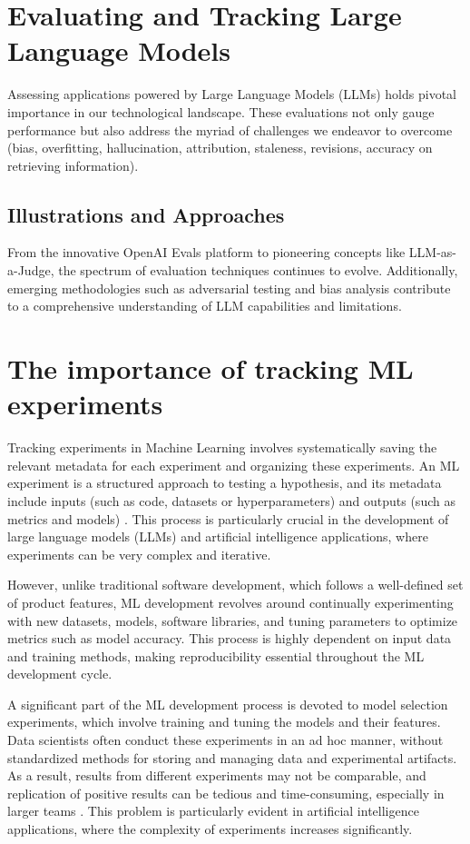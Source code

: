 \section{Evaluating and Tracking Large Language Models}
Assessing applications powered by Large Language Models (LLMs) holds pivotal importance in our technological landscape. These evaluations not only gauge performance but also address the myriad of challenges we endeavor to overcome (bias, overfitting, hallucination, attribution, staleness, revisions, accuracy on retrieving information).

\subsection{Illustrations and Approaches}

From the innovative OpenAI Evals platform to pioneering concepts like LLM-as-a-Judge, the spectrum of evaluation techniques continues to evolve. Additionally, emerging methodologies such as adversarial testing and bias analysis contribute to a comprehensive understanding of LLM capabilities and limitations.

\newpage

\section{The importance of tracking ML experiments}

Tracking experiments in Machine Learning involves systematically saving the relevant metadata for each experiment and organizing these experiments. An ML experiment is a structured approach to testing a hypothesis, and its metadata include inputs (such as code, datasets or hyperparameters) and outputs (such as metrics and models) \cite{wandb2023}. This process is particularly crucial in the development of large language models (LLMs) and artificial intelligence applications, where experiments can be very complex and iterative.

However, unlike traditional software development, which follows a well-defined set of product features, ML development revolves around continually experimenting with new datasets, models, software libraries, and tuning parameters to optimize metrics such as model accuracy. This process is highly dependent on input data and training methods, making reproducibility essential throughout the ML development cycle.

A significant part of the ML development process is devoted to model selection experiments, which involve training and tuning the models and their features. Data scientists often conduct these experiments in an ad hoc manner, without standardized methods for storing and managing data and experimental artifacts. As a result, results from different experiments may not be comparable, and replication of positive results can be tedious and time-consuming, especially in larger teams \cite{schelter2017automatically}. This problem is particularly evident in artificial intelligence applications, where the complexity of experiments increases significantly.

